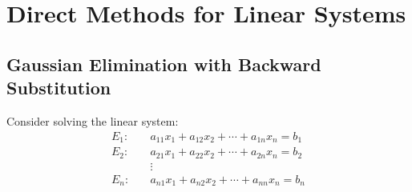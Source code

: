 \documentclass[../main.tex]{subfiles}
\begin{document}
\chapter{Direct Methods for Linear Systems}

\section{Gaussian Elimination with Backward Substitution}

Consider solving the linear system:
\begin{equation}
  \begin{aligned}
    E_1: &\quad a_{11}x_1 + a_{12}x_2 + \cdots + a_{1n}x_n = b_1 \\
    E_2: &\quad a_{21}x_1 + a_{22}x_2 + \cdots + a_{2n}x_n = b_2 \\
    &\quad \vdots \\
    E_n: &\quad a_{n1}x_1 + a_{n2}x_2 + \cdots + a_{nn}x_n = b_n
  \end{aligned}
\end{equation}
\end{document}
